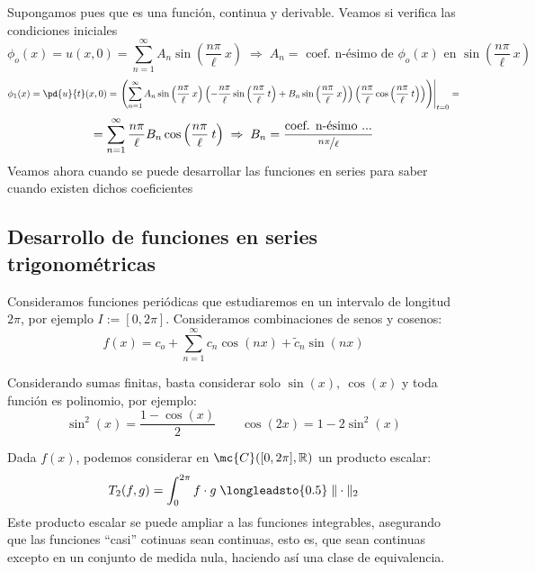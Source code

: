 \begin{eje}
    Supongamos pues que es una función, continua y derivable. Veamos si verifica las condiciones iniciales
    $$\phi_o(x)=u(x,0)=\sum_{n=1}^{\infty} A_n \sin\left( \dfrac{n \pi}{\ell} \: x\right) \; \Rightarrow \; A_n=\text{ coef. n-ésimo de } \phi_o(x) \text{ en } \sin\left( \dfrac{n \pi}{\ell} \: x\right) $$
    $$\phi_1(x)=\pd{u}{t}(x,0)=\left.\left( \sum_{n=1}^{\infty} A_n \sin\left( \dfrac{n \pi}{\ell} \: x\right)  \left( -\dfrac{n \pi}{\ell} \sin \left(\dfrac{n \pi}{\ell} \: t\right) + B_n\sin\left( \dfrac{n \pi}{\ell} \: x\right) \right) \left( \dfrac{n \pi}{\ell} \cos \left(\dfrac{n \pi}{\ell} \: t\right)\right)\right) \right|_{t=0}=$$
    $$=\sum_{n=1}^{\infty}  \dfrac{n \pi}{\ell} B_n \cos \left(\dfrac{n \pi}{\ell} \: t \right) \; \Rightarrow \; B_n=\dfrac{\text{coef. n-ésimo ...}}{\nicefrac{n \pi}{\ell}}$$
    Veamos ahora cuando se puede desarrollar las funciones en series para saber cuando existen dichos coeficientes
    \subsection{Desarrollo de funciones en series trigonométricas}
    Consideramos funciones periódicas que estudiaremos en un intervalo de longitud $2\pi$, por ejemplo $I:=[0,2\pi]$. Consideramos combinaciones de senos y cosenos:
    $$f(x)=c_o + \sum_{n=1}^{\infty} c_n \cos(nx) + \tilde{c}_n \sin(nx)$$
    \begin{obs}
        Considerando sumas finitas, basta considerar solo $\sin(x), \: \cos(x)$ y toda función es polinomio, por ejemplo:
        $$\sin^2(x)=\dfrac{1-\cos(x)}{2} \qquad \cos(2x)=1-2\sin^2(x)$$
    \end{obs}
    Dada $f(x)$, podemos considerar en $\mc{C}([0,2\pi],\mathbb R)$ un producto escalar:
    $$T_2(f,g)=\int_0^{2\pi} f \cdot g \;  \longleadsto{0.5} \; \|\cdot \|_2$$
    Este producto escalar se puede ampliar a las funciones integrables, asegurando que las funciones ``casi'' cotinuas sean continuas, esto es, que sean continuas excepto en un conjunto de medida nula, haciendo así una clase de equivalencia.


\end{eje}
